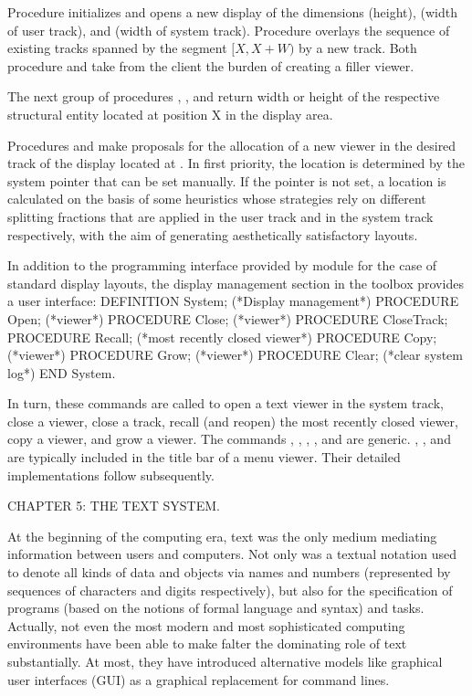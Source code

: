 \noindent Procedure  initializes and opens a new display of the
dimensions  (height),  (width of user track), and  (width of
system track). Procedure  overlays the sequence of existing
tracks spanned by the segment $[X, X + W)$ by a new track. Both
procedure  and  take from the client the burden
of creating a filler viewer.

The next group of procedures , ,
 and  return
width or height of the respective structural entity located at
position X in the display area.

Procedures  and  make proposals
for the allocation of a new viewer in the desired track of the display
located at . In first priority, the location is determined by the
system pointer that can be set manually. If the pointer is not set, a
location is calculated on the basis of some heuristics whose
strategies rely on different splitting fractions that are applied in
the user track and in the system track respectively, with the aim of
generating aesthetically satisfactory layouts.

In addition to the programming interface provided by module  for
the case of standard display layouts, the display management section
in the  toolbox provides a user interface:
\begintt
DEFINITION System; (*Display management*)
  PROCEDURE Open; (*viewer*)
  PROCEDURE Close; (*viewer*)
  PROCEDURE CloseTrack;
  PROCEDURE Recall; (*most recently closed viewer*)
  PROCEDURE Copy; (*viewer*)
  PROCEDURE Grow; (*viewer*)
  PROCEDURE Clear; (*clear system log*)
END System.
\endtt

\noindent In turn, these commands are called to open a text viewer in
the system track, close a viewer, close a track, recall (and reopen)
the most recently closed viewer, copy a viewer, and grow a viewer. The
commands , , , ,
and  are generic. , ,
and  are typically included in the title bar of a menu
viewer. Their detailed implementations follow subsequently.

\beginchapter CHAPTER 5: THE TEXT SYSTEM.

At the beginning of the computing era, text was the only medium
mediating information between users and computers. Not only was a
textual notation used to denote all kinds of data and objects via
names and numbers (represented by sequences of characters and digits
respectively), but also for the specification of programs (based on
the notions of formal language and syntax) and tasks. Actually, not
even the most modern and most sophisticated computing environments
have been able to make falter the dominating role of text
substantially. At most, they have introduced alternative models like
graphical user interfaces (GUI) as a graphical replacement for command
lines.

